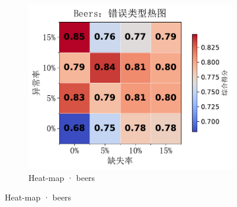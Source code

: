 \documentclass[10pt]{article} %
\numberwithin{equation}{section}
\begin{document}
\begin{figure}[htbp]
\begin{subfigure}{0.295\linewidth}
    \centering
    \includegraphics[width=\linewidth]{figures/5.3.2graph/beers_heatmap.pdf}
    \caption{Heat-map · beers}
  \end{subfigure}


\end{figure}
\end{document}
